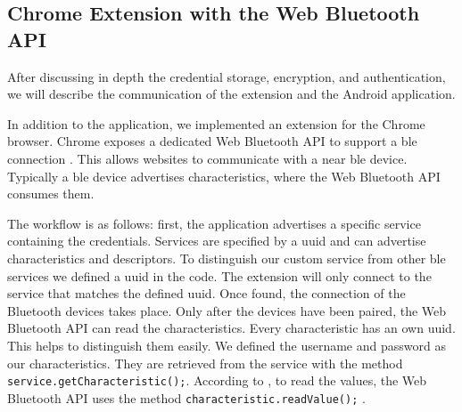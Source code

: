 
\subsection{Chrome Extension with the Web Bluetooth API}
After discussing in depth the credential storage, encryption, and authentication, we will describe the communication of the extension and the Android application.

In addition to the application, we implemented an extension for the Chrome browser. Chrome exposes a dedicated Web Bluetooth API to support a \gls{ble} connection \cite{WebBTAPI}. This allows websites to communicate with a near \gls{ble} device. Typically a \gls{ble} device advertises characteristics, where the Web Bluetooth API consumes them.

The workflow is as follows: first, the application advertises a specific service containing the credentials. Services are specified by a \gls{uuid} and can advertise characteristics and descriptors. To distinguish our custom service from other \gls{ble} services we defined a \gls{uuid} in the code. The extension will only connect to the service that matches the defined \gls{uuid}. Once found, the connection of the Bluetooth devices takes place. Only after the devices have been paired, the Web Bluetooth API can read the characteristics. Every characteristic has an own \gls{uuid}. This helps to distinguish them easily. We defined the username and password as our characteristics. They are retrieved from the service with the method \texttt{service.getCharacteristic();}. According to \cite{WebBTAPI}, to read the values, the Web Bluetooth API uses the method \texttt{characteristic.readValue();} .
